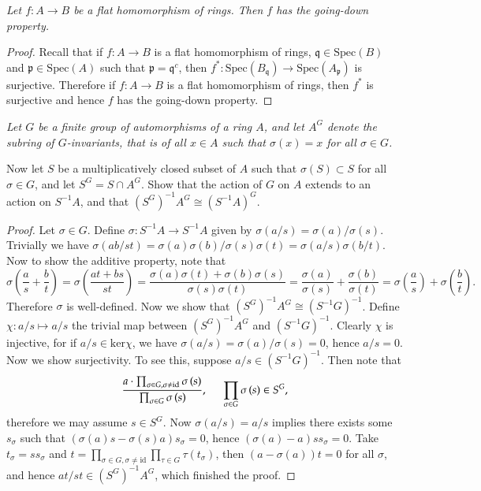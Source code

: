 \begin{problem}\em
Let $f:A\to B$ be a flat homomorphism of rings. Then $f$ has the going-down property.
\end{problem}
\begin{proof}
Recall that if $f:A\to B$ is a flat homomorphism of rings, $\mathfrak{q}\in\mathrm{Spec}(B)$ and $\mathfrak{p}\in\mathrm{Spec}(A)$  such that $\mathfrak{p}=\mathfrak{q}^c$, then $f^*:\mathrm{Spec}(B_\mathfrak{q})\to\mathrm{Spec}(A_\mathfrak{p})$ is surjective. Therefore if $f:A\to B$ is a flat homomorphism of rings, then $f^*$ is surjective and hence $f$ has the going-down property.
\end{proof}
\begin{problem}\em
Let $G$ be a finite group of automorphisms of a ring $A$, and let $A^G$ denote the subring of $G$-invariants, that is of all $x\in A$ such that $\sigma(x)=x$ for all $\sigma\in G$.\par
Now let $S$ be a multiplicatively closed subset of $A$ such that $\sigma(S)\subset S$ for all $\sigma\in G$, and let $S^G=S\cap A^G$. Show that the action of $G$ on $A$ extends to an action on $S^{-1}A$, and that $(S^G)^{-1}A^G\cong(S^{-1}A)^G$.
\end{problem}
\begin{proof}
Let $\sigma\in G$. Define $\sigma:S^{-1}A\to S^{-1}A$ given by $\sigma(a/s)=\sigma(a)/\sigma(s)$. Trivially we have $\sigma(ab/st)=\sigma(a)\sigma(b)/\sigma(s)\sigma(t)=\sigma(a/s)\sigma(b/t)$. Now to show the additive property, note that 
$$
\sigma \left( \frac{a}{s}+\frac{b}{t} \right) =\sigma \left( \frac{at+bs}{st} \right) =\frac{\sigma \left( a \right) \sigma \left( t \right) +\sigma \left( b \right) \sigma \left( s \right)}{\sigma \left( s \right) \sigma \left( t \right)}=\frac{\sigma \left( a \right)}{\sigma \left( s \right)}+\frac{\sigma \left( b \right)}{\sigma \left( t \right)}=\sigma \left( \frac{a}{s} \right) +\sigma \left( \frac{b}{t} \right) .
$$
Therefore $\sigma$ is well-defined. Now we show that $(S^G)^{-1}A^G\cong(S^{-1}G)^{-1}$. Define $\chi:a/s\mapsto a/s$ the trivial map between $(S^G)^{-1}A^G$ and $(S^{-1}G)^{-1}$. Clearly $\chi$ is injective, for if $a/s\in\mathrm{ker}\chi$, we have $\sigma(a/s)=\sigma(a)/\sigma(s)=0$, hence $a/s=0$. Now we show surjectivity. To see this, suppose $a/s\in(S^{-1}G)^{-1}$. Then note that 
$$
\frac{a\cdot \prod_{\sigma \in G,\sigma \ne \mathrm{id}}{\sigma \left( s \right)}}{\prod_{\sigma \in G}{\sigma \left( s \right)}},\hspace{0.5cm}\prod_{\sigma \in G}{\sigma \left( s \right)}\in S^G,
$$
therefore we may assume $s\in S^G$. Now $\sigma(a/s)=a/s$ implies there exists some $s_\sigma$ such that $(\sigma(a)s-\sigma(s)a)s_\sigma=0$, hence $(\sigma(a)-a)ss_\sigma=0$. Take $t_\sigma=ss_\sigma$ and $t=\prod_{\sigma\in G,\sigma\ne\mathrm{id}}\prod_{\tau\in G}\tau(t_\sigma)$, then $(a-\sigma(a))t=0$ for all $\sigma$, and hence $at/st\in (S^G)^{-1}A^G$, which finished the proof. 
\end{proof}
